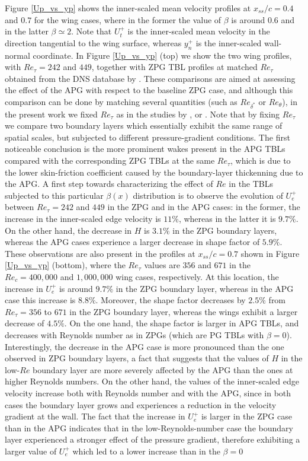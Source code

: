 \documentclass[preprint,12pt,authoryear]{elsarticle}
\begin{document}
Figure \ref{Up_vs_yp} shows the inner-scaled mean velocity profiles at $x_{ss} /c =0.4$ and $0.7$ for the wing cases, where in the former the value of $\beta$ is around $0.6$ and in the latter $\beta \simeq 2$. Note that $U^{+}_{t}$ is the inner-scaled mean velocity in the direction tangential to the wing surface, whereas $y^{+}_{n}$ is the inner-scaled wall-normal coordinate. In Figure \ref{Up_vs_yp} (top) we show the two wing profiles, with $Re_{\tau}=242$ and $449$, together with ZPG TBL profiles at matched $Re_{\tau}$ obtained from the DNS database by \cite{schlatter_orlu10}. These comparisons are aimed at assessing the effect of the APG with respect to the baseline ZPG case, and although this comparison can be done by matching several quantities (such as $Re_{\delta^{*}}$ or $Re_{\theta}$), in the present work we fixed $Re_{\tau}$ as in the studies by \cite{monty_et_al}, \cite{harun_et_al} or \cite{bobke_et_al}. Note that by fixing $Re_{\tau}$ we compare two boundary layers which essentially exhibit the same range of spatial scales, but subjected to different pressure-gradient conditions. The first noticeable conclusion is the more prominent wakes present in the APG TBLs compared with the corresponding ZPG TBLs at the same $Re_{\tau}$, which is due to the lower skin-friction coefficient caused by the boundary-layer thickenning due to the APG. A first step towards characterizing the effect of $Re$ in the TBLs subjected to this particular $\beta(x)$ distribution is to observe the evolution of $U^{+}_{e}$ between $Re_{\tau}=242$ and $449$ in the ZPG and in the APG cases: in the former, the increase in the inner-scaled edge velocity is $11\%$, whereas in the latter it is $9.7\%$. On the other hand, the decrease in $H$ is $3.1\%$ in the ZPG boundary layers, whereas the APG cases experience a larger decrease in shape factor of $5.9\%$. These observations are also present in the profiles at $x_{ss}/c=0.7$ shown in Figure \ref{Up_vs_yp} (bottom), where the $Re_{\tau}$ values are $356$ and $671$ in the $Re_{c}=400,000$ and $1,000,000$ wing cases, respectively. At this location, the increase in $U^{+}_{e}$ is around $9.7\%$ in the ZPG boundary layer, whereas in the APG case this increase is $8.8\%$. Moreover, the shape factor decreases by $2.5\%$ from $Re_{\tau}=356$ to $671$ in the ZPG boundary layer, whereas the wings exhibit a larger decrease of $4.5\%$. On the one hand, the shape factor is larger in APG TBLs, and decreases with Reynolds number as in ZPGs (which are PG TBLs with $\beta=0$). Interestingly, the decrease in the APG case is more pronounced than the one observed in ZPG boundary layers, a fact that suggests that the values of $H$ in the low-$Re$ boundary layer are more severely affected by the APG than the ones at higher Reynolds numbers. On the other hand, the values of the inner-scaled edge velocity increase both with Reynolds number and with the APG, since in both cases the boundary layer grows and experiences a reduction in the velocity gradient at the wall. The fact that the increase in $U^{+}_{e}$ is larger in the ZPG case than in the APG indicates that in the low-Reynolds-number case the boundary layer experienced a stronger effect of the pressure gradient, therefore exhibiting a larger value of $U^{+}_{e}$ which led to a lower increase than in the $\beta=0$ 
\end{document}
